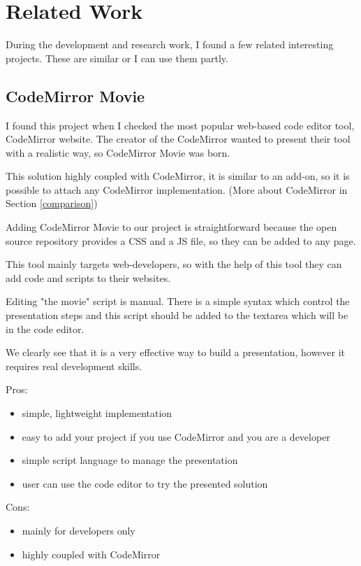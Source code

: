 \documentclass[12pt, a4paper, oneside, openright, medskipamount]{report}
\begin{document}
\chapter{Related Work}

During the development and research work, I found a few related interesting projects. These are similar or I can use them partly.

\section{CodeMirror Movie}

I found this project when I checked the most popular web-based code editor tool, CodeMirror website. The creator of the CodeMirror wanted to present their tool with a realistic way, so CodeMirror Movie was born. \cite{cm-movie}

This solution highly coupled with CodeMirror, it is similar to an add-on, so it is possible to attach any CodeMirror implementation. (More about CodeMirror in Section \ref{comparison})

Adding CodeMirror Movie to our project is straightforward because the open source repository provides a CSS and a JS file, so they can be added to any page.

This tool mainly targets web-developers, so with the help of this tool they can add code and scripts to their websites.

Editing "the movie" script is manual. There is a simple syntax which control the presentation steps and this script should be added to the textarea which will be in the code editor.

We clearly see that it is a very effective way to build a presentation, however it requires real development skills.

\noindent Pros:
\begin{itemize}[noitemsep]
\item simple, lightweight implementation
\item easy to add your project if you use CodeMirror and you are a developer
\item simple script language to manage the presentation
\item user can use the code editor to try the presented solution
\end{itemize}
Cons:
\begin{itemize}[noitemsep]
\item mainly for developers only
\item highly coupled with CodeMirror
\end{itemize}
\end{document}
